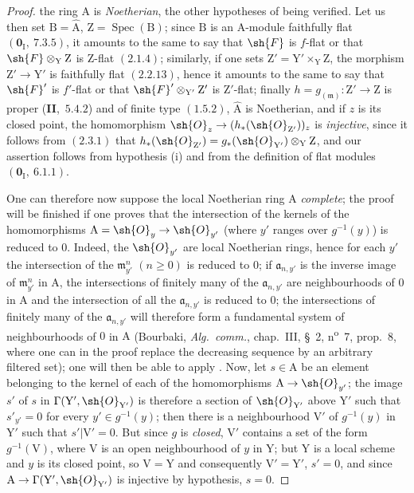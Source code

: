 \begin{proof}
the ring $\mathrm{A}$ is \emph{Noetherian}, the other hypotheses of  being verified. Let us then set
$\mathrm{B}=\hat{\mathrm{A}}$, $\mathrm{Z}=\operatorname{Spec}(\mathrm{B})$; since $\mathrm{B}$ is an $\mathrm{A}$-module faithfully flat $(\mathbf{0}_\mathrm{I},~7.3.5)$, it amounts
to the same to say that $\sh{F}$ is $f$-flat or that $\sh{F}\otimes_\mathrm{Y}\mathrm{Z}$ is $\mathrm{Z}$-flat $(2.1.4)$; similarly, if one
sets $\mathrm{Z}'=\mathrm{Y}'\times_\mathrm{Y}\mathrm{Z}$, the morphism $\mathrm{Z}'\to\mathrm{Y}'$ is faithfully flat $(2.2.13)$, hence
it amounts to the same to say that $\sh{F}'$ is $f'$-flat or that $\sh{F}'\otimes_{\mathrm{Y}'}\mathrm{Z}'$ is $\mathrm{Z}'$-flat; finally $h=g_{(\mathfrak{m})}:\mathrm{Z}'\to\mathrm{Z}$
is proper (\textbf{II},~$5.4.2$) and of finite type $(1.5.2)$, $\hat{\mathrm{A}}$ is Noetherian, and if $z$ is its
closed point, the homomorphism $\sh{O}_z\to(h_*(\sh{O}_{\mathrm{Z}'}))_z$ is \emph{injective}, since it follows from $(2.3.1)$ that
$h_*(\sh{O}_{\mathrm{Z}'})=g_*(\sh{O}_{\mathrm{Y}'})\otimes_\mathrm{Y}\mathrm{Z}$, and our assertion follows from hypothesis (i) and from the definition of
flat modules $(\mathbf{0}_\mathrm{I},~6.1.1)$.

One can therefore now suppose the local Noetherian ring $\mathrm{A}$ \emph{complete}; the proof
will be finished if one proves that the intersection of the kernels of the homomorphisms
$\mathrm{A}=\sh{O}_y\to\sh{O}_{y'}$ (where $y'$ ranges over $g^{-1}(y)$) is reduced to $0$. Indeed, the $\sh{O}_{y'}$ are local
Noetherian rings, hence for each $y'$ the intersection of the $\mathfrak{m}_{y'}^n$ $(n\geq 0)$ is reduced to $0$;
if $\mathfrak{a}_{n,y'}$ is the inverse image of $\mathfrak{m}_{y'}^n$ in $\mathrm{A}$, the intersections of finitely many of the $\mathfrak{a}_{n,y'}$ are
neighbourhoods of $0$ in $\mathrm{A}$ and the intersection of all the $\mathfrak{a}_{n,y'}$ is reduced to $0$; the intersections
of finitely many of the $\mathfrak{a}_{n,y'}$ will therefore form a fundamental system of neighbourhoods of $0$ in $\mathrm{A}$
(Bourbaki, \emph{Alg.\ comm.}, chap.~III, \S~2, n\textsuperscript{o}~7, prop.~8, where one can in the proof
replace the decreasing sequence by an arbitrary filtered set); one will then be able to
apply . Now, let $s\in\mathrm{A}$ be an element belonging to the kernel of each of
the homomorphisms $\mathrm{A}\to\sh{O}_{y'}$; the image $s'$ of $s$ in $\Gamma(\mathrm{Y}',\sh{O}_{\mathrm{Y}'})$ is therefore a section
of $\sh{O}_{\mathrm{Y}'}$ above $\mathrm{Y}'$ such that $s'_{y'}=0$ for every $y'\in g^{-1}(y)$; then there is a neighbourhood $\mathrm{V}'$
of $g^{-1}(y)$ in $\mathrm{Y}'$ such that $s'|\mathrm{V}'=0$. But since $g$ is \emph{closed}, $\mathrm{V}'$ contains a set
of the form $g^{-1}(\mathrm{V})$, where $\mathrm{V}$ is an open neighbourhood of $y$ in $\mathrm{Y}$; but $\mathrm{Y}$ is a local scheme
and $y$ is its closed point, so $\mathrm{V}=\mathrm{Y}$ and consequently $\mathrm{V}'=\mathrm{Y}'$,
$s'=0$, and since $\mathrm{A}\to\Gamma(\mathrm{Y}',\sh{O}_{\mathrm{Y}'})$ is injective by hypothesis, $s=0$.
\end{proof}

